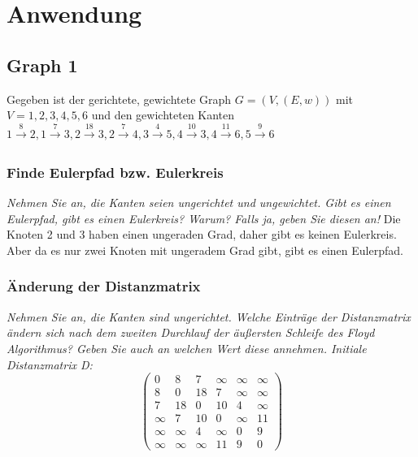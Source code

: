 \documentclass{article}
\begin{document}
\newpage
\section{Anwendung}
\newpage
\subsection{Graph 1}
Gegeben ist der gerichtete, gewichtete Graph $G = (V, (E, w))$ mit $V = {1, 2, 3, 4, 5, 6}$ und den gewichteten Kanten 
$1 \xrightarrow{8} 2, 1 \xrightarrow[]{7}
3, 2 \xrightarrow[]{18}
3, 2 \xrightarrow[]{7}
4, 3 \xrightarrow[]{4}
5, 4 \xrightarrow[]{10}
3, 4 \xrightarrow[]{11}
6, 5 \xrightarrow[]{9}
6 $ \cite{probeklausur21}
\subsubsection{Finde Eulerpfad bzw. Eulerkreis \textcolor{ForestGreen}{\CheckmarkBold}}
\textit{Nehmen Sie an, die Kanten seien ungerichtet und ungewichtet. Gibt es einen Eulerpfad, gibt es einen Eulerkreis? Warum? Falls ja, geben Sie diesen an!}\cite{probeklausur21} \newline \newline 
Die Knoten 2 und 3 haben einen ungeraden Grad, daher gibt es keinen Eulerkreis. Aber da es nur zwei Knoten mit ungeradem Grad gibt, gibt es einen Eulerpfad.  

\subsubsection{Änderung der Distanzmatrix \textcolor{ForestGreen}{\CheckmarkBold}} 
\textit{Nehmen Sie an, die Kanten sind ungerichtet. Welche Einträge der Distanzmatrix  ändern sich nach dem zweiten Durchlauf der äußersten Schleife des Floyd Algorithmus? Geben Sie auch an welchen Wert diese annehmen.\newline
Initiale Distanzmatrix  D:} \cite{probeklausur21} \newline
\[
\begin{pmatrix}
    0 & 8 & 7 & \infty & \infty & \infty \\
    8 & 0 & 18 & 7 & \infty & \infty \\
    7 & 18 & 0 & 10 & 4 & \infty \\
    \infty & 7 & 10 & 0 & \infty & 11 \\
    \infty & \infty & 4 & \infty & 0 & 9 \\
    \infty & \infty & \infty & 11 & 9 & 0
\end{pmatrix}
\]  
\end{document}
